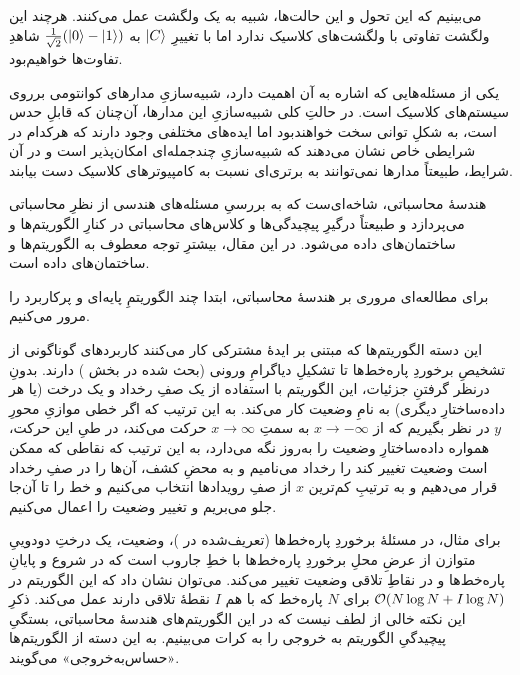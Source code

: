 می‌بینیم که این تحول و این حالت‌ها، شبیه به یک ولگشت عمل می‌کنند. هرچند این ولگشت تفاوتی با ولگشت‌های کلاسیک ندارد اما با تغییرِ $\ket{C}$ به 
$\frac{1}{\sqrt{2}}(\ket{0} - \ket{1})$
شاهدِ تفاوت‌ها خواهیم‌بود.

یکی از مسئله‌هایی که اشاره به آن اهمیت دارد، شبیه‌سازیِ مدارهای کوانتومی برروی سیستم‌های کلاسیک است. در حالتِ کلی شبیه‌سازیِ این مدارها، آن‌چنان که قابلِ حدس است، به شکلِ توانی سخت خواهندبود اما ایده‌های مختلفی وجود دارند که هرکدام در شرایطی خاص نشان می‌دهند که شبیه‌سازیِ چندجمله‌ای امکان‌پذیر است و در آن شرایط، طبیعتاً مدارها نمی‌توانند به برتری‌ای نسبت به کامپیوترهای کلاسیک دست بیابند.


هندسهٔ محاسباتی، شاخه‌ای‌ست که به بررسیِ مسئله‌های هندسی از نظرِ محاسباتی می‌پردازد و طبیعتاً درگیرِ پیچیدگی‌ها و کلاس‌های محاسباتی در کنارِ الگوریتم‌ها و ساختمان‌های داده می‌شود. در این مقال، بیشترِ توجه معطوف به الگوریتم‌ها و ساختمان‌های داده است.

برای مطالعه‌ای مروری بر هندسهٔ محاسباتی، ابتدا چند الگوریتمِ پایه‌ای و پرکاربرد را مرور می‌کنیم.

این دسته الگوریتم‌ها که مبتنی بر ایدهٔ مشترکی کار می‌کنند کاربردهای گوناگونی از تشخیصِ برخوردِ پاره‌خط‌ها تا تشکیلِ 
دیاگرامِ ورونی (بحث شده در بخش )
دارند. بدونِ درنظر گرفتنِ جزئیات، این الگوریتم با استفاده از یک صفِ رخداد و یک درخت (یا هر داده‌ساختارِ دیگری) به نامِ وضعیت کار می‌کند. به این ترتیب که اگر خطی موازیِ محورِ $y$ در نظر بگیریم که از $x\to-\infty$ به سمتِ $x\to\infty$ حرکت می‌کند، در طیِ این حرکت، همواره داده‌ساختارِ وضعیت را به‌روز نگه می‌دارد، به این ترتیب که نقاطی که ممکن است وضعیت تغییر کند را رخداد می‌نامیم و به محضِ کشف، آن‌ها را در صفِ رخداد قرار می‌دهیم و به ترتیبِ کم‌ترین $x$ از صفِ رویدادها انتخاب می‌کنیم و خط را تا آن‌جا جلو می‌بریم و تغییر وضعیت را اعمال می‌کنیم.

برای مثال، در مسئلهٔ برخوردِ پاره‌خط‌ها (تعریف‌شده در )، وضعیت، یک درختِ دودوییِ متوازن از عرضِ محلِ برخوردِ پاره‌خط‌ها با خطِ جاروب است که در شروع و پایانِ پاره‌خط‌ها و در نقاطِ تلاقی وضعیت تغییر می‌کند. می‌توان نشان داد که این الگوریتم در 
$\mathcal{O}(N \log N + I \log N)$
برای $N$ پاره‌خط که با هم $I$ نقطهٔ تلاقی دارند عمل می‌کند. ذکرِ این نکته خالی از لطف نیست که در این الگوریتم‌های هندسهٔ محاسباتی، بستگیِ پیچیدگیِ الگوریتم به خروجی را به کرات می‌بینیم. به این دسته از الگوریتم‌ها «حساس‌به‌خروجی» می‌گویند. 

